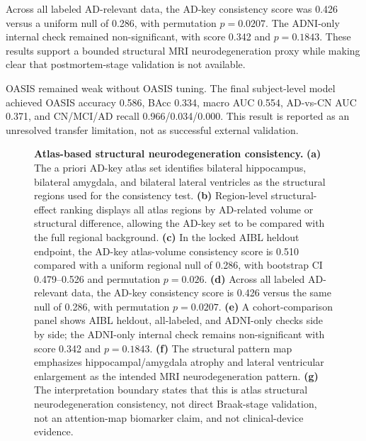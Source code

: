 Across all labeled AD-relevant data, the AD-key consistency score was 0.426 versus a uniform null of 0.286, with permutation $p=0.0207$. The ADNI-only internal check remained non-significant, with score 0.342 and $p=0.1843$. These results support a bounded structural MRI neurodegeneration proxy while making clear that postmortem-stage validation is not available.

OASIS remained weak without OASIS tuning. The final subject-level model achieved OASIS accuracy 0.586, BAcc 0.334, macro AUC 0.554, AD-vs-CN AUC 0.371, and CN/MCI/AD recall 0.966/0.034/0.000. This result is reported as an unresolved transfer limitation, not as successful external validation.

\begin{figure}[p]
    \centering
    \caption{\textbf{Atlas-based structural neurodegeneration consistency.} \textbf{(a)} The a priori AD-key atlas set identifies bilateral hippocampus, bilateral amygdala, and bilateral lateral ventricles as the structural regions used for the consistency test. \textbf{(b)} Region-level structural-effect ranking displays all atlas regions by AD-related volume or structural difference, allowing the AD-key set to be compared with the full regional background. \textbf{(c)} In the locked AIBL heldout endpoint, the AD-key atlas-volume consistency score is 0.510 compared with a uniform regional null of 0.286, with bootstrap CI 0.479--0.526 and permutation $p=0.026$. \textbf{(d)} Across all labeled AD-relevant data, the AD-key consistency score is 0.426 versus the same null of 0.286, with permutation $p=0.0207$. \textbf{(e)} A cohort-comparison panel shows AIBL heldout, all-labeled, and ADNI-only checks side by side; the ADNI-only internal check remains non-significant with score 0.342 and $p=0.1843$. \textbf{(f)} The structural pattern map emphasizes hippocampal/amygdala atrophy and lateral ventricular enlargement as the intended MRI neurodegeneration pattern. \textbf{(g)} The interpretation boundary states that this is atlas structural neurodegeneration consistency, not direct Braak-stage validation, not an attention-map biomarker claim, and not clinical-device evidence.}
    \label{fig:v6_biology}
\end{figure}


